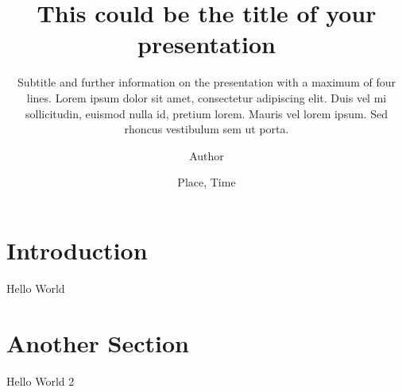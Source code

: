 \documentclass[
	aspectratio=169
	] {beamer}
\title[Shorttitle]{This could be the title of your presentation\-}
\subtitle{Subtitle and further information on the presentation with a maximum of four lines. Lorem ipsum dolor sit amet, consectetur adipiscing elit. Duis vel mi sollicitudin, euismod nulla id, pretium lorem. Mauris vel lorem ipsum. Sed rhoncus vestibulum sem ut porta. }
\author{Author}
\date{Place, Time}
\begin{document}
	\begin{frame}[plain]
		\titlepage
	\end{frame}

\maketocframe

\section{Introduction}
\begin{frame}{Hello World}
	\blindtext
\end{frame}

\section{Another Section}
\begin{frame}{Hello World 2}
	\blindtext
\end{frame}
\end{document}
